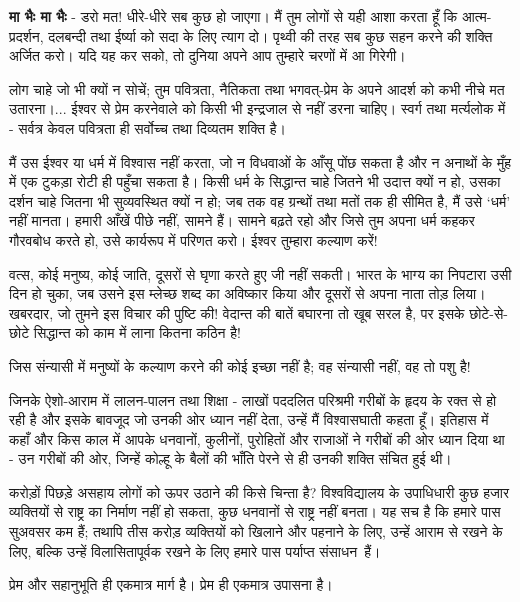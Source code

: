 \textbf{मा भैः मा भैः } - डरो मत! धीरे-धीरे सब कुछ हो जाएगा। मैं तुम लोगों से यही आशा करता हूँ कि आत्म-प्रदर्शन, दलबन्दी तथा ईर्ष्या को सदा के लिए त्याग दो। पृथ्वी की तरह सब कुछ सहन करने की शक्ति अर्जित करो। यदि यह कर सको, तो दुनिया अपने आप तुम्हारे चरणों में आ गिरेगी। 

लोग चाहे जो भी क्यों न सोचें; तुम पवित्रता, नैतिकता तथा भगवत्-प्रेम के अपने आदर्श को कभी नीचे मत उतारना।... ईश्वर से प्रेम करनेवाले को किसी भी इन्द्रजाल से नहीं डरना चाहिए। स्वर्ग तथा मर्त्यलोक में - सर्वत्र केवल पवित्रता ही सर्वोच्च तथा दिव्यतम शक्ति है। 

मैं उस ईश्वर या धर्म में विश्वास नहीं करता, जो न विधवाओं के आँसू पोंछ सकता है और न अनाथों के मुँह में एक टुकड़ा रोटी ही पहुँचा सकता है। किसी धर्म के सिद्धान्त चाहे जितने भी उदात्त क्यों न हो, उसका दर्शन चाहे जितना भी सुव्यवस्थित क्यों न हो; जब तक वह ग्रन्थों तथा मतों तक ही सीमित है, मैं उसे ‘धर्म’ नहीं मानता। हमारी आँखें पीछे नहीं, सामने हैं। सामने बढ़ते रहो और जिसे तुम अपना धर्म कहकर गौरवबोध करते हो, उसे कार्यरूप में परिणत करो। ईश्वर तुम्हारा कल्याण करें! 

वत्स, कोई मनुष्य, कोई जाति, दूसरों से घृणा करते हुए जी नहीं सकती। भारत के भाग्य का निपटारा उसी दिन हो चुका, जब उसने इस म्लेच्छ शब्द का अविष्कार किया और दूसरों से अपना नाता तोड़ लिया। खबरदार, जो तुमने इस विचार की पुष्टि की! वेदान्त की बातें बघारना तो खूब सरल है, पर इसके छोटे-से-छोटे सिद्धान्त को काम में लाना कितना कठिन है! 

जिस संन्यासी में मनुष्यों के कल्याण करने की कोई इच्छा नहीं है; वह संन्यासी नहीं, वह तो पशु है! 

जिनके ऐशो-आराम में लालन-पालन तथा शिक्षा - लाखों पददलित परिश्रमी गरीबों के हृदय के रक्त से हो रही है और इसके बावजूद जो उनकी ओर ध्यान नहीं देता, उन्हें मैं विश्वासघाती कहता हूँ। इतिहास में कहाँ और किस काल में आपके धनवानों, कुलीनों, पुरोहितों और राजाओं ने गरीबों की ओर ध्यान दिया था - उन गरीबों की ओर, जिन्हें कोल्हू के बैलों की भाँति पेरने से ही उनकी शक्ति संचित हुई थी। 

करोड़ों पिछड़े असहाय लोगों को ऊपर उठाने की किसे चिन्ता है? विश्वविद्यालय के उपाधिधारी कुछ हजार व्यक्तियों से राष्ट्र का निर्माण नहीं हो सकता, कुछ धनवानों से राष्ट्र नहीं बनता। यह सच है कि हमारे पास सुअवसर कम हैं; तथापि तीस करोड़ व्यक्तियों को खिलाने और पहनाने के लिए, उन्हें आराम से रखने के लिए, बल्कि उन्हें विलासितापूर्वक रखने के लिए हमारे पास पर्याप्त संसाधन~हैं। 

प्रेम और सहानुभूति ही एकमात्र मार्ग है। प्रेम ही एकमात्र उपासना है। 

